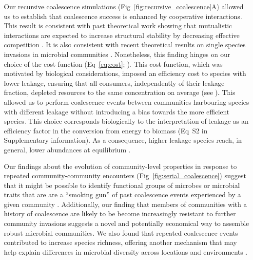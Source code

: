 \documentclass[10pt,letterpaper]{article}
\begin{document}
Our recursive coalescence simulations (Fig~\ref{fig:recursive_coalescence}A) allowed us to establish that coalescence success is enhanced by cooperative interactions. This result is consistent with past theoretical work showing that mutualistic interactions are expected to increase structural stability by decreasing effective competition \cite{Bastolla2009}. It is also consistent with recent theoretical results on single species invasions in microbial communities  \cite{Kurkjian2021}. Nonetheless, this finding hinges on our choice of the cost function (Eq~\eqref{eq:cost}; ). This cost function, which was motivated by biological considerations, imposed an efficiency cost to species with lower leakage, ensuring that all consumers, independently of their leakage fraction, depleted resources to the same concentration on average (see ). This allowed us to perform coalescence events between communities harbouring species with different leakage without introducing a bias towards the more efficient species. This choice corresponds biologically to the interpretation of leakage as an efficiency factor in the conversion from energy to biomass (Eq~S2 in Supplementary information). As a consequence, higher leakage species reach, in general, lower abundances at equilibrium \cite{Wieser1994}.

Our findings about the evolution of community-level properties in response to repeated community-community encounters (Fig~\ref{fig:serial_coalescence}) suggest that it might be possible to identify functional groups of microbes or microbial traits that are are a ``smoking gun'' of past coalescence events experienced by a given community \cite{Rillig2015}. Additionally, our finding that members of communities with a history of coalescence are likely to be become increasingly resistant to further community invasions suggests a novel and potentially economical way to assemble robust microbial communities. We also found that repeated coalescence events contributed to increase species richness, offering another mechanism that may help explain differences in microbial diversity across locations and environments \cite{Rillig2015}. 
\end{document}
